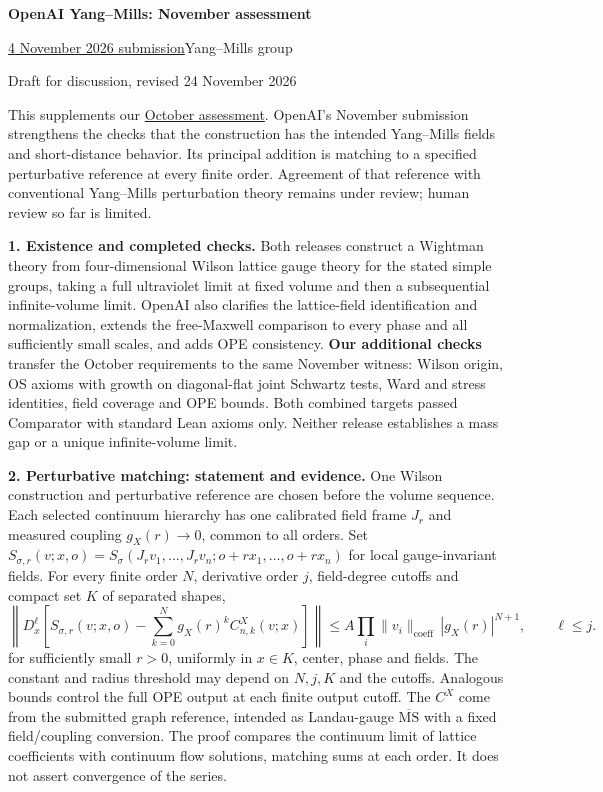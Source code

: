 \documentclass[11pt]{article}
\begin{document}
\begin{center}
{\Large\bfseries OpenAI Yang--Mills: November assessment}\par
\vspace{3pt}
\href{https://github.com/yang-mills-group/OpenAI-YM-20261104/tree/c1bb5a5566b2bad9d593980d470439f815895317/}{4 November 2026 submission}\quad\textbullet\quad Yang--Mills group\par
{\small Draft for discussion, revised 24 November 2026}
\end{center}
\vspace{-4pt}

This supplements our \href{https://github.com/yang-mills-group/YM/blob/main/docs/assessment-1.pdf}{October assessment}.
OpenAI's November submission strengthens the checks that the construction has
the intended Yang--Mills fields and short-distance behavior. Its principal
addition is matching to a specified perturbative reference at every finite
order. Agreement of that reference with conventional Yang--Mills perturbation
theory remains under review; human review so far is limited.

\textbf{1. Existence and completed checks.}
Both releases construct a Wightman theory from four-dimensional Wilson lattice
gauge theory for the stated simple groups, taking a full ultraviolet limit at
fixed volume and then a subsequential infinite-volume limit. OpenAI also clarifies
the lattice-field identification and normalization, extends the free-Maxwell
comparison to every phase and all sufficiently small scales, and adds OPE consistency.
\textbf{Our additional checks} transfer the October requirements to the same
November witness: Wilson origin,
OS axioms with growth on diagonal-flat joint Schwartz tests, Ward and stress
identities, field coverage and OPE bounds. Both combined targets passed
Comparator with standard Lean axioms only. Neither release establishes a mass
gap or a unique infinite-volume limit.

\textbf{2. Perturbative matching: statement and evidence.}
One Wilson construction and perturbative reference are chosen before the
volume sequence. Each selected continuum hierarchy has one calibrated field
frame $J_r$ and measured coupling $g_X(r)\to0$, common to all orders. Set
$S_{\sigma,r}(v;x,o)=S_\sigma(J_rv_1,\ldots,J_rv_n;o+rx_1,\ldots,o+rx_n)$
for local gauge-invariant fields. For every finite order $N$, derivative order
$j$, field-degree cutoffs and compact set $K$ of separated shapes,
\[
 \left\|D_x^\ell\!\left[S_{\sigma,r}(v;x,o)
       -\sum_{k=0}^{N}g_X(r)^k C^X_{n,k}(v;x)\right]\right\|
 \le A\!\prod_i\|v_i\|_{\mathrm{coeff}}\,|g_X(r)|^{N+1},
 \qquad \ell\le j.
\]
for sufficiently small $r>0$, uniformly in $x\in K$, center, phase and fields.
The constant and radius threshold may depend on $N,j,K$ and the cutoffs.
Analogous bounds control the full OPE output at each finite output cutoff.
The $C^X$ come from the submitted graph reference, intended as Landau-gauge
$\overline{\mathrm{MS}}$ with a fixed field/coupling conversion. The proof compares the
continuum limit of lattice coefficients with continuum flow solutions,
matching sums at each order. It does not assert convergence of the series.
\end{document}
